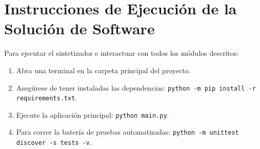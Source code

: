 \documentclass[11pt,a4paper]{article}
\begin{document}
\section{Instrucciones de Ejecución de la Solución de Software}

Para ejecutar el sintetizador e interactuar con todos los módulos descritos:
\begin{enumerate}[leftmargin=1.5cm]
    \item Abra una terminal en la carpeta principal del proyecto.
    \item Asegúrese de tener instaladas las dependencias: \texttt{python -m pip install -r requirements.txt}.
    \item Ejecute la aplicación principal: \texttt{python main.py}.
    \item Para correr la batería de pruebas automatizadas: \texttt{python -m unittest discover -s tests -v}.
\end{enumerate}
\end{document}
